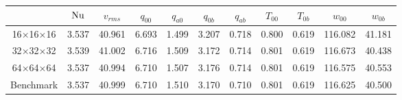\begin{tabular}{c|cccccccccc}
    & $\mathrm{Nu}$ & $v_{rms}$ & $q_{00}$ & $q_{a0}$ &  $q_{0b}$ &$q_{ab}$ & $T_{00}$ & $T_{0b}$ & $w_{00}$ & $w_{0b}$ \\
\hline
16$\times$16$\times$16 & 3.537 & 40.961 & 6.693 & 1.499 & 3.207 & 0.718 &0.800 & 0.619 &116.082 & 41.181 \\
32$\times$32$\times$32 & 3.539 & 41.002 & 6.716 & 1.509 & 3.172 & 0.714 &0.801 & 0.619 &116.673 & 40.438 \\
64$\times$64$\times$64 & 3.537 & 40.994 & 6.710 & 1.507 & 3.176 & 0.714 &0.801 & 0.619 &116.575 & 40.553 \\
\hline
Benchmark & 3.537 & 40.999 & 6.710 & 1.510 & 3.170 & 0.710 &0.801 & 0.619 &116.625 & 40.500 \\
\end{tabular}
